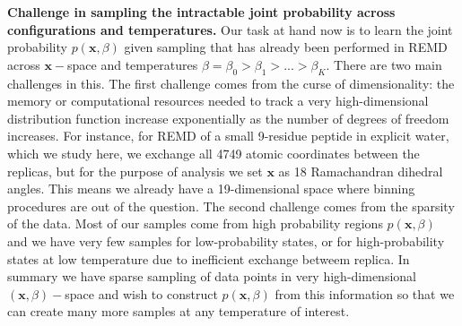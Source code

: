 \documentclass[9pt,twocolumn,twoside]{pnas-new}
\begin{document}
\textbf{Challenge in sampling the intractable joint probability across configurations and temperatures.} Our task at hand now is to learn the joint probability $p(\mathbf{x},\beta)$ given sampling that has already been performed in REMD across $\mathbf{x}-$space and temperatures $\beta = \beta_0 > \beta_1 > ... > \beta_K $. There are two main challenges in this. The first challenge comes from the curse of dimensionality: the memory or computational resources needed to track a very high-dimensional distribution function increase exponentially as the number of degrees of freedom increases. For instance, for REMD of a small 9-residue peptide in explicit water, which we study here, we exchange all 4749 atomic coordinates between the replicas, but for the purpose of analysis we set $\mathbf{x}$ as 18 Ramachandran dihedral angles. This means we already have a 19-dimensional space where binning procedures are out of the question. The second challenge comes from the sparsity of the data. Most of our samples come from high probability regions $p(\mathbf{x},\beta)$ and we have very few samples for low-probability states, or for high-probability states at low temperature due to inefficient exchange betweem replica. In summary we have sparse sampling of data points in very high-dimensional $(\mathbf{x},\beta)-$space and wish to construct $p(\mathbf{x},\beta)$ from this information so that we can create many more samples at any temperature of interest.
\end{document}
